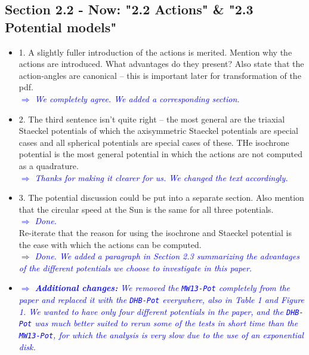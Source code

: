 \documentclass[10pt,a4paper]{article}
\newcommand{\Comment}[1]{\textsl{\textcolor{Blue}{$\Longrightarrow$ {#1}}}}
\begin{document}
\subsection{Section 2.2 - Now: "2.2 Actions" \& "2.3 Potential models"}
\begin{itemize}
\item 1. A slightly fuller introduction of the actions is merited. Mention why the actions are introduced. What advantages do they present? Also state that the action-angles are canonical -- this is important later for transformation of the pdf. \\\Comment{We completely agree. We added a corresponding section.}
\item 2. The third sentence isn't quite right -- the most general are the triaxial Staeckel potentials of which the axisymmetric Staeckel potentials are special cases and all spherical potentials are special cases of these. THe isochrone potential is the most general potential in which the actions are not computed as a quadrature. \\\Comment{Thanks for making it clearer for us. We changed the text accordingly.}
\item 3. The potential discussion could be put into a separate section. Also mention that the circular speed at the Sun is the same for all three potentials. \\\Comment{Done.} \\
Re-iterate that the reason for using the isochrone and Staeckel potential is the ease with which the actions can be computed. \\\Comment{Done. We added a paragraph in Section 2.3 summarizing the advantages of the different potentials we choose to investigate in this paper.}
\item \Comment{\textbf{Additional changes:} We removed the \texttt{MW13-Pot} completely from the paper and replaced it with the \texttt{DHB-Pot} everywhere, also in Table 1 and Figure 1. We wanted to have only four different potentials in the paper, and the \texttt{DHB-Pot} was much better suited to rerun some of the tests in short time than the \texttt{MW13-Pot}, for which the analysis is very slow due to the use of an exponential disk.}
\end{itemize}
\end{document}
